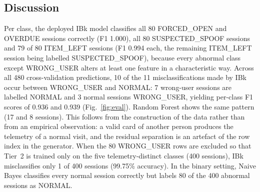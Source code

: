 \documentclass[journal,onecolumn]{IEEEtran}
\begin{document}
\subsection{Discussion}

Per class, the deployed IBk model classifies all 80 FORCED\_OPEN and OVERDUE sessions correctly (F1 1.000), all 80
SUSPECTED\_SPOOF sessions and 79 of 80 ITEM\_LEFT sessions (F1 0.994 each, the remaining ITEM\_LEFT session being
labelled SUSPECTED\_SPOOF), because every abnormal class except WRONG\_USER alters at least one feature in a
characteristic way. Across all 480 cross-validation predictions, 10 of the 11 misclassifications made by IBk occur
between WRONG\_USER and NORMAL: 7 wrong-user sessions are labelled NORMAL and 3 normal sessions WRONG\_USER, yielding
per-class F1 scores of 0.936 and 0.939 (Fig.~\ref{fig:eval}). Random Forest shows the same pattern (17 and 8 sessions).
This follows from the construction of the data rather than from an empirical observation: a valid card of another person
produces the telemetry of a normal visit, and the residual separation is an artefact of the row index in the generator.
When the 80 WRONG\_USER rows are excluded so that Tier~2 is trained only on the five telemetry-distinct classes
(400 sessions), IBk misclassifies only 1 of 400 sessions (99.75\% accuracy).
In the binary setting, Naive Bayes classifies every normal session correctly but labels 80 of the 400 abnormal sessions
as NORMAL.
\end{document}
